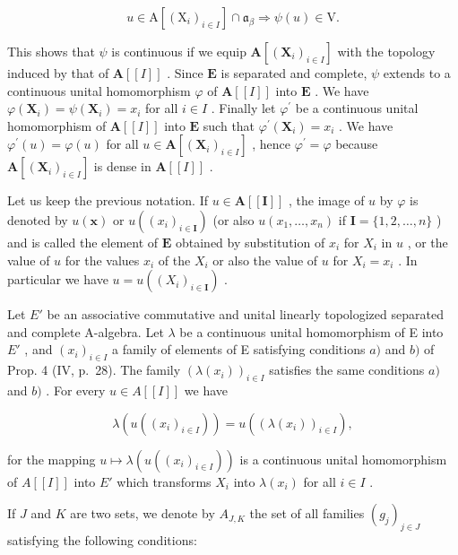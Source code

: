 \[
u \in \mathrm{A} \left[ \left(\mathrm{X} _ {i}\right) _ {i \in I} \right] \cap \mathfrak {a} _ {\beta} \Rightarrow \psi (u) \in \mathrm{V}.
\]

This shows that \(\psi\) is continuous if we equip \(\mathbf{A}[(\mathbf{X}_i)_{i\in I}]\) with the topology induced by that of \(\mathbf{A}[[I]]\) . Since \(\mathbf{E}\) is separated and complete, \(\psi\) extends to a continuous unital homomorphism \(\varphi\) of \(\mathbf{A}[[I]]\) into \(\mathbf{E}\) . We have \(\varphi (\mathbf{X}_i) = \psi (\mathbf{X}_i) = x_i\) for all \(i\in I\) . Finally let \(\varphi^{\prime}\) be a continuous unital homomorphism of \(\mathbf{A}[[I]]\) into \(\mathbf{E}\) such that \(\varphi^{\prime}(\mathbf{X}_{i}) = x_{i}\) . We have \(\varphi^{\prime}(u) = \varphi (u)\) for all \(u\in \mathbf{A}[(\mathbf{X}_i)_{i\in I}]\) , hence \(\varphi^{\prime} = \varphi\) because \(\mathbf{A}[(\mathbf{X}_i)_{i\in I}]\) is dense in \(\mathbf{A}[[I]]\) .

Let us keep the previous notation. If \(u \in \mathbf{A}[[\mathbf{I}]]\) , the image of \(u\) by \(\varphi\) is denoted by \(u(\mathbf{x})\) or \(u((x_i)_{i \in \mathbf{I}})\) (or also \(u(x_1, \ldots, x_n)\) if \(\mathbf{I} = \{1, 2, \ldots, n\}\) ) and is called the element of \(\mathbf{E}\) obtained by substitution of \(x_i\) for \(X_i\) in \(u\) , or the value of \(u\) for the values \(x_i\) of the \(X_i\) or also the value of \(u\) for \(X_i = x_i\) . In particular we have \(u = u((X_i)_{i \in \mathbf{I}})\) .

Let \(E'\) be an associative commutative and unital linearly topologized separated and complete A-algebra. Let \(\lambda\) be a continuous unital homomorphism of E into \(E'\) , and \((x_i)_{i \in I}\) a family of elements of E satisfying conditions \(a)\) and \(b)\) of Prop. 4 (IV, p.~28). The family \((\lambda(x_i))_{i \in I}\) satisfies the same conditions \(a)\) and \(b)\) . For every \(u \in A[[I]]\) we have

\[
\lambda \left(u \left(\left(x _ {i}\right) _ {i \in I}\right)\right) = u \left(\left(\lambda \left(x _ {i}\right)\right) _ {i \in I}\right),\tag{3}
\]

for the mapping \(u \mapsto \lambda(u((x_i)_{i \in I}))\) is a continuous unital homomorphism of \(A[[I]]\) into \(E'\) which transforms \(X_i\) into \(\lambda(x_i)\) for all \(i \in I\) .

If \(J\) and \(K\) are two sets, we denote by \(A_{J,K}\) the set of all families \((g_j)_{j \in J}\) satisfying the following conditions:

